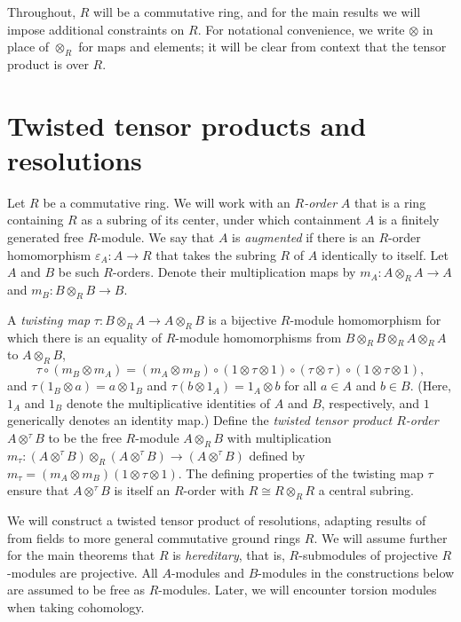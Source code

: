 \documentclass[11pt]{amsart}
\numberwithin{equation}{section}
\theoremstyle{definition}
\theoremstyle{remark}
\newcommand\ot{\otimes}
\newcommand{\ttp}{A\ot^{\tau}\! B}
\begin{document}
Throughout, $R$ will be a commutative ring, and for the main results
we will impose additional constraints on $R$. 
For notational convenience, we write $\ot$ in place of $\ot_R$
for maps and elements; it will be clear from context that
the tensor product is over $R$. 


\section{Twisted tensor products and resolutions}\label{sec:ttp}

Let $R$ be a commutative ring.
We will work with an {\em $R$-order} $A$ that is a ring containing $R$ 
as a subring of its center, under which containment $A$ is a finitely generated
free $R$-module.
We say that $A$ is {\em augmented} if there is an $R$-order homomorphism
$\varepsilon_A: A \rightarrow R$ that takes the subring $R$ of $A$ identically to itself. 
Let $A$ and $B$ be such $R$-orders. 
Denote their multiplication maps by
$m_A: A\ot_R A\rightarrow A$ and $m_B: B\ot_R B\rightarrow B$.

A {\em twisting map} $\tau: B\ot_R A\rightarrow A\ot_R B$ 
is a bijective $R$-module homomorphism for which there is an equality of
$R$-module homomorphisms from $B\ot_R B\ot_R A\ot_R A$ to 
$A\ot_R B$,
\begin{equation}\label{eqn:twisting-mult}
\tau \circ (m_B \ot m_A) = 
(m_A \ot m_B) \circ (1 \ot \tau \ot 1)
\circ (\tau \otimes \tau) \circ (1 \ot \tau \ot 1) , 
\end{equation}
and $\tau(1_B\ot a) = a\ot 1_B$ and 
$\tau(b \ot 1_A) = 1_A \ot b$ for all $a\in A$ and $b\in B$. 
(Here, $1_A$ and $1_B$ denote the multiplicative identities 
of $A$ and $B$, respectively, and $1$ generically denotes an identity map.) 
Define the 
{\it twisted tensor product $R$-order}
$\ttp$ to be the free $R$-module $A\otimes_R B$ 
with multiplication $m_\tau: (\ttp)\ot_R (\ttp) \rightarrow (\ttp)$ 
defined by $m_\tau =  (m_A\ot m_B) (1\ot \tau\ot 1)$. 
The defining properties of the twisting map $\tau$ ensure that $\ttp$ 
is itself an $R$-order with $R\cong R\ot_R R$ a central subring. 

We will construct a twisted tensor product of resolutions,
adapting results of~\cite{Shepler-W} from fields to more general
commutative ground rings $R$.
We will assume further for the main theorems
that $R$ is {\em hereditary}, that is, $R$-submodules of
projective $R$-modules are projective. 
All $A$-modules and $B$-modules in the constructions below are 
assumed to be free as $R$-modules. 
Later, we will encounter torsion modules when taking cohomology.
\end{document}
